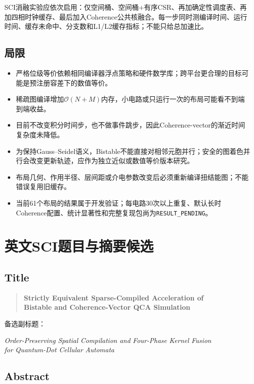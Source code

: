\documentclass[UTF8,a4paper,11pt]{ctexart}
\newcommand{\pending}{\texttt{RESULT\_PENDING}}
\newcommand{\csr}{\textsc{CSR}}
\begin{document}
SCI消融实验应依次启用：仅空间桶、空间桶+有序\csr{}、再加确定性调度表、再加四相时钟缓存、最后加入Coherence公共核融合。每一步同时测编译时间、运行时间、缓存未命中、分支数和L1/L2缓存指标；不能只给总加速比。

\subsection{局限}

\begin{itemize}
  \item 严格位级等价依赖相同编译器浮点策略和硬件数学库；跨平台更合理的目标可能是预注册容差下的数值等价。
  \item 稀疏图编译增加$\mathcal O(N+M)$内存，小电路或只运行一次的布局可能看不到端到端收益。
  \item 目前不改变积分时间步，也不做事件跳步，因此Coherence-vector的渐近时间复杂度未降低。
  \item 为保持Gauss--Seidel语义，Bistable不能直接对相邻元胞并行；安全的图着色并行会改变更新轨迹，应作为独立近似或数值等价版本研究。
  \item 布局几何、作用半径、层间距或介电参数改变后必须重新编译扭结能图；不能错误复用旧缓存。
  \item 当前61个布局的结果属于开发验证；每电路30次以上重复、默认长时Coherence配置、统计显著性和完整复现包尚为\pending。
\end{itemize}

\section{英文SCI题目与摘要候选}

\subsection*{Title}

\begin{quote}
\centering\textbf{Strictly Equivalent Sparse-Compiled Acceleration of\\
Bistable and Coherence-Vector QCA Simulation}
\end{quote}

备选副标题：
\begin{center}
\textit{Order-Preserving Spatial Compilation and Four-Phase Kernel Fusion\\
for Quantum-Dot Cellular Automata}
\end{center}

\subsection*{Abstract}
\end{document}
